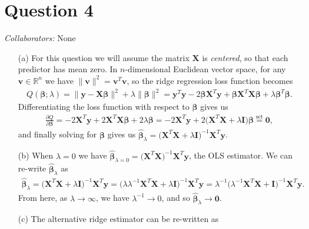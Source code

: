 \documentclass[10pt]{article}
\newcommand{\mycolaba}[1]{\textcolor{colabcol}{\textsl{Collaborators:}} #1}
\begin{document}
\section{Question 4} \noindent
\mycolaba{None}
\begin{itemize}
    \item[(a)] For this question we will assume the matrix \(\mathbf{X}\) is \textsl{centered}, so that each predictor has mean zero. 
    In \(n\)-dimensional Euclidean vector space, for any \(\mathbf{v} \in \mathbb{R}^n\) we have \(\|\mathbf{v}\|^2 = \mathbf{v}^T\mathbf{v}\), 
    so the ridge regression loss function becomes 
    \begin{align*}
        Q(\bm{\beta}; \lambda) 
        = \| \mathbf{y} - \mathbf{X}\bm{\beta} \|^2 + \lambda \|\bm{\beta}\|^2
        = \mathbf{y}^T\mathbf{y} - 2 \bm{\beta}\mathbf{X}^T\mathbf{y} + \bm{\beta} \mathbf{X}^T \mathbf{X} \bm{\beta} + \lambda \bm{\beta}^T \bm{\beta}.
    \end{align*}
    Differentiating the loss function with respect to \(\bm{\beta}\) gives us 
    \begin{align*}
        \frac{\partial Q}{\partial \bm{\beta}}
        = -2 \mathbf{X}^T \mathbf{y} + 2 \mathbf{X}^T\mathbf{X}\bm{\beta} + 2 \lambda \bm{\beta}
        = -2 \mathbf{X}^T \mathbf{y} + 2 \big( \mathbf{X}^T\mathbf{X} + \lambda \mathbf{I} \big) \bm{\beta}
        \overset{\text{set}}{=} \mathbf{0},
    \end{align*}
    and finally solving for \(\bm{\beta}\) gives us 
    \(\hat{\bm{\beta}}_{\lambda} = \big( \mathbf{X}^T\mathbf{X} + \lambda \mathbf{I} \big)^{-1} \mathbf{X}^T\mathbf{y}\).
    \item[(b)] When \(\lambda = 0\) we have \(\hat{\bm{\beta}}_{\lambda = 0} = \big( \mathbf{X}^T\mathbf{X} \big)^{-1} \mathbf{X}^T\mathbf{y}\), the OLS 
    estimator. We can re-write \(\hat{\bm{\beta}}_{\lambda}\) as 
    \begin{align*}
        \hat{\bm{\beta}}_{\lambda}
        = \big( \mathbf{X}^T \mathbf{X} + \lambda \mathbf{I} \big)^{-1} \mathbf{X}^T \mathbf{y}
        = \big( \lambda \lambda^{-1} \mathbf{X}^T \mathbf{X} + \lambda \mathbf{I} \big)^{-1} \mathbf{X}^T \mathbf{y}
        = \lambda^{-1} \big( \lambda^{-1} \mathbf{X}^T \mathbf{X} + \mathbf{I} \big)^{-1} \mathbf{X}^T \mathbf{y}.
    \end{align*}
    From here, as \(\lambda \to \infty\), we have \(\lambda^{-1} \to 0\), and so \(\hat{\bm{\beta}}_{\lambda} \to \mathbf{0}\).
    \item[(c)] The alternative ridge estimator can be re-written as 

\end{itemize}
\end{document}
